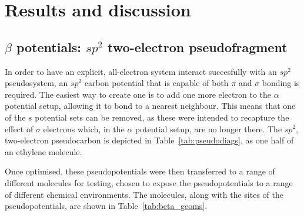 \documentclass[aip,reprint,nofootinbib]{revtex4-1}
\begin{document}
\section{Results and discussion} 

\subsection{$\beta$ potentials: $sp^{2}$ two-electron pseudofragment}

In order to have an explicit, all-electron system interact succesfully with an $sp^2$ pseudosystem, an $sp^2$ carbon potential that is capable of both $\pi$ and $\sigma$ bonding is required. The easiest way to create one is to add one more electron to the $\alpha$ potential setup, allowing it to bond to a nearest neighbour. This means that one of the $s$ potential sets can be removed, as these were intended to recapture the effect of $\sigma$ electrons which, in the $\alpha$ potential setup, are no longer there. The $sp^2$, two-electron pseudocarbon is depicted in Table~\ref{tab:pseudodiags}, as one half of an ethylene molecule.

Once optimised, these pseudopotentials were then transferred to a range of different molecules for testing, chosen to expose the pseudopotentials to a range of different chemical environments. The molecules, along with the sites of the pseudopotentials, are shown in Table~\ref{tab:beta_geoms}.
\end{document}
